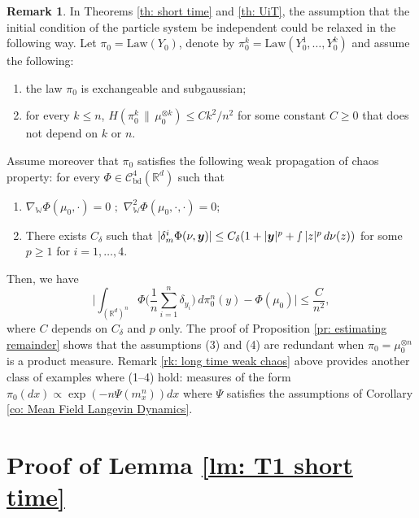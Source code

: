 \documentclass[11pt,reqno]{amsart}
\numberwithin{equation}{section}
\theoremstyle{definition}
\newtheorem{remark}[theorem]{Remark}
\def\R{{\mathbb R}}
\newcommand{\wgrad}{\nabla_{\W}}
\newcommand{\W}{\mathbb W}
\begin{document}
\begin{remark}
\label{rk: beyond iid}
In Theorems \ref{th: short time} and \ref{th: UiT}, the assumption that the initial condition of the particle system be independent could be relaxed in the following way. Let $\pi_0=\text{Law}(Y_0)$, denote by $\pi^k_0=\text{Law}(Y_0^1,\dots,Y_0^k)$ and assume the following:
    \begin{enumerate}
        \item[(1)]  the law $\pi_0$ is exchangeable and subgaussian;
        \item[(2)]  for every $k\leq n$, $H(\pi_0^k\,\|\,\mu_0^{\otimes k})\leq C k^2/n^2$ for some constant $C\geq 0$ that does not depend on $k$ or $n$.
    \end{enumerate}
    Assume moreover that $\pi_0$ satisfies the following weak propagation of chaos property: for every $\Phi \in \mathcal C_{\text{bd}}^4(\R^d)$ such that
    \begin{enumerate}
        \item[(3)] $\wgrad \Phi(\mu_0,\cdot)=0\,\,;\,\,\wgrad^2 \Phi(\mu_0,\cdot,\cdot)=0$;
        \item[(4)] There exists $C_{\delta}$ such that $|\delta_m^i \Phi(\nu,\boldsymbol{y})|\leq C_{\delta}(1+|\boldsymbol{y}|^p+\smallint |z|^{p}\,d\nu(z))$ for some $p\geq 1$ for $i=1,\dots,4$.
    \end{enumerate}
    Then, we have
    \begin{equation*}
        \Big|\int_{(\R^d)^n} \Phi\Big(\frac1n \sum_{i=1}^n\delta_{y_i}\Big)\,d\pi_0^n(y)-\Phi(\mu_0)\Big|\leq \frac{C}{n^2},
    \end{equation*}
    where $C$ depends on $C_\delta$ and $p$ only. 
    The proof of Proposition \ref{pr: estimating remainder} shows that the assumptions (3) and (4) are redundant when $\pi_0=\mu_0^{\otimes n}$ is a product measure. Remark \ref{rk: long time weak chaos} above provides another class of examples where (1--4) hold: measures of the form $\pi_0(dx) \propto \exp(-n\Psi(m^n_x))dx$ where $\Psi$ satisfies the assumptions of Corollary \ref{co: Mean Field Langevin Dynamics}.
\end{remark}

\appendix

\section{Proof of Lemma \ref{lm: T1 short time} } \label{ap:T1shorttime}
\end{document}
